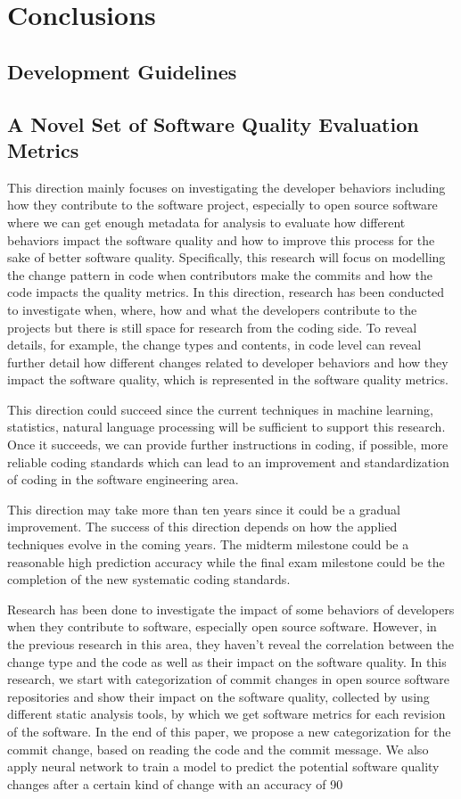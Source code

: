 \section{Conclusions}
\subsection{Development Guidelines}
\subsection{A Novel Set of Software Quality Evaluation Metrics}


This direction mainly focuses on investigating the developer behaviors including how they contribute to the software project, especially to open source software where we can get enough metadata for analysis to evaluate how different behaviors impact the software quality and how to improve this process for the sake of better software quality. Specifically, this research will focus on modelling the change pattern in code when contributors make the commits and how the code impacts the quality metrics. In this direction, research has been conducted to investigate when, where, how and what the developers contribute to the projects but there is still space for research from the coding side. To reveal details, for example, the change types and contents, in code level can reveal further detail how different changes related to developer behaviors and how they impact the software quality, which is represented in the software quality metrics.

This direction could succeed since the current techniques in machine learning, statistics, natural language processing will be sufficient to support this research. Once it succeeds, we can provide further instructions in coding, if possible, more reliable coding standards which can lead to an improvement and standardization of coding in the software engineering area.

This direction may take more than ten years since it could be a gradual improvement. The success of this direction depends on how the applied techniques evolve in the coming years. The midterm milestone could be a reasonable high prediction accuracy while the final exam milestone could be the completion of the new systematic coding standards.


Research has been done to investigate the impact of some behaviors of developers when they contribute to software, especially open source software. However, in the previous research in this area, they haven't reveal the correlation between the change type and the code as well as their impact on the software quality. In this research, we start with categorization of commit changes in open source software repositories and show their impact on the software quality, collected by using different static analysis tools, by which we get software metrics for each revision of the software. In the end of this paper, we propose a new categorization for the commit change, based on reading the code and the commit message. We also apply neural network to train a model to predict the potential software quality changes after a certain kind of change with an accuracy of 90%

